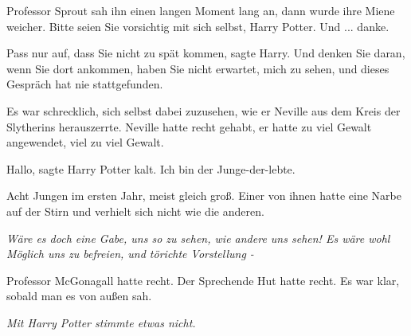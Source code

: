 Professor Sprout sah ihn einen langen Moment lang an, dann wurde ihre Miene
weicher. \glqq{}Bitte seien Sie vorsichtig mit sich selbst, Harry Potter. Und ...
danke.\grqq{}

\glqq{}Pass nur auf, dass Sie nicht zu spät kommen\grqq{}, sagte Harry. \glqq{}Und
denken Sie daran, wenn Sie dort ankommen, haben Sie nicht erwartet, mich zu
sehen, und dieses Gespräch hat nie stattgefunden.\grqq{}

Es war schrecklich, sich selbst dabei zuzusehen, wie er Neville aus dem Kreis
der Slytherins herauszerrte. Neville hatte recht gehabt, er hatte zu viel Gewalt
angewendet, viel zu viel Gewalt.

\glqq{}Hallo\grqq{}, sagte Harry Potter kalt. \glqq{}Ich bin der
Junge-der-lebte.\grqq{}

Acht Jungen im ersten Jahr, meist gleich groß. Einer von ihnen hatte eine Narbe
auf der Stirn und verhielt sich nicht wie die anderen.

\emph{Wäre es doch eine Gabe, uns so zu sehen, wie andere uns sehen! Es wäre
wohl Möglich uns zu befreien, und törichte Vorstellung -}

Professor McGonagall hatte recht. Der Sprechende Hut hatte recht. Es war klar,
sobald man es von außen sah.

\emph{Mit Harry Potter stimmte etwas nicht.}
